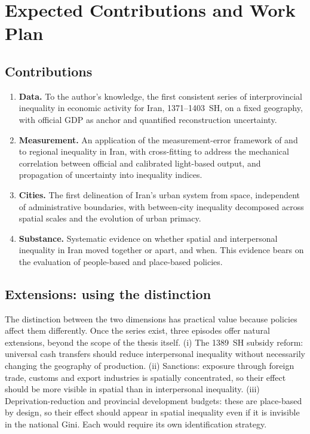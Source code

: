 \documentclass[11pt,a4paper]{article}
\begin{document}
\section{Expected Contributions and Work Plan}\label{sec:contrib}

\subsection{Contributions}

\begin{keybox}[title={Expected contributions}]
\begin{enumerate}[label=\arabic*.,leftmargin=1.2em]
\item \textbf{Data.} To the author's knowledge, the first consistent series of interprovincial inequality in economic activity for Iran, 1371--1403~SH, on a fixed geography, with official GDP as anchor and quantified reconstruction uncertainty.
\item \textbf{Measurement.} An application of the measurement-error framework of \citet{ChenNordhaus2011} and \citet{HendersonStoreygardWeil2012} to regional inequality in Iran, with cross-fitting to address the mechanical correlation between official and calibrated light-based output, and propagation of uncertainty into inequality indices.
\item \textbf{Cities.} The first delineation of Iran's urban system from space, independent of administrative boundaries, with between-city inequality decomposed across spatial scales and the evolution of urban primacy.
\item \textbf{Substance.} Systematic evidence on whether spatial and interpersonal inequality in Iran moved together or apart, and when. This evidence bears on the evaluation of people-based and place-based policies.
\end{enumerate}
\end{keybox}

\subsection{Extensions: using the distinction}\label{sec:extensions}

The distinction between the two dimensions has practical value because policies affect them differently. Once the series exist, three episodes offer natural extensions, beyond the scope of the thesis itself. (i) The 1389~SH subsidy reform: universal cash transfers should reduce interpersonal inequality without necessarily changing the geography of production. (ii) Sanctions: exposure through foreign trade, customs and export industries is spatially concentrated, so their effect should be more visible in spatial than in interpersonal inequality. (iii) Deprivation-reduction and provincial development budgets: these are place-based by design, so their effect should appear in spatial inequality even if it is invisible in the national Gini. Each would require its own identification strategy.
\end{document}
